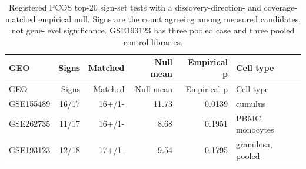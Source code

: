 \begin{longtable}{lrrrrp{3cm}}
\caption{Registered PCOS top-20 sign-set tests with a discovery-direction- and coverage-matched empirical null. Signs are the count agreeing among measured candidates, not gene-level significance. GSE193123 has three pooled case and three pooled control libraries.}\label{tab:pcos}\\
\hline GEO & Signs & Matched & Null mean & Empirical p & Cell type\\\hline\endfirsthead
\hline GEO & Signs & Matched & Null mean & Empirical p & Cell type\\\hline\endhead
GSE155489 & 16/17 & 16+/1- & 11.73 & 0.0139 & cumulus\\
GSE262735 & 11/17 & 16+/1- & 8.68 & 0.1951 & PBMC monocytes\\
GSE193123 & 12/18 & 17+/1- & 9.54 & 0.1795 & granulosa, pooled\\
\hline\end{longtable}
